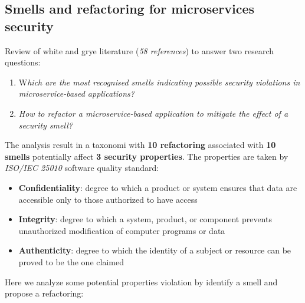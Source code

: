 \documentclass[10pt,a4paper]{report}
\begin{document}
\subsection{Smells and refactoring for microservices security}
Review of white and grye literature (\textit{58 references}) to answer two research questions:
\begin{enumerate}
	\item W\textit{hich are the most recognised smells indicating possible security violations in
	microservice-based applications?}
	\item  \textit{How to refactor a microservice-based application to mitigate the effect of a security
	smell?}
\end{enumerate}
The analysis result in a taxonomi with \textbf{10 refactoring} associated with \textbf{10 smells} potentially affect \textbf{3 security properties}. The properties are taken by \textit{ISO/IEC 25010} software quality standard:
\begin{itemize}
	\item \textbf{Confidentiality}: degree to which a product or system ensures that data are accessible
	only to those authorized to have access
	\item \textbf{Integrity}: degree to which a system, product, or component prevents unauthorized
	modification of computer programs or data
	\item \textbf{Authenticity}: degree to which the identity of a subject or resource can be proved to be
	the one claimed
	
\end{itemize}
Here we analyze some potential properties violation by identify a smell and propose a refactoring:
\end{document}
